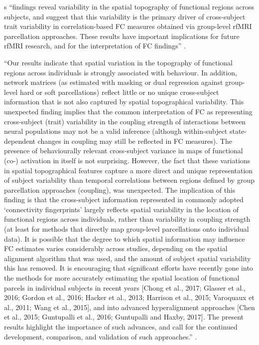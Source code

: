 \citet{bijsterbosch2018relationship}s ``findings reveal variability in the
spatial topography of functional regions across subjects, and suggest that this
variability is the primary driver of cross-subject trait variability in
correlation-based FC measures obtained via group-level rfMRI parcellation
approaches.
%
These results have important implications for future rfMRI research, and for the
interpretation of FC findings'' \citep{bijsterbosch2018relationship}.



``Our results indicate that spatial variation in the topography of functional
regions across individuals is strongly associated with behaviour.
%
In addition, network matrices (as estimated with masking or dual regression
against group-level hard or soft parcellations) reflect little or no unique
cross-subject information that is not also captured by spatial topographical
variability.
%
This unexpected finding implies that the common interpretation of FC as
representing cross-subject (trait) variability in the coupling strength of
interactions between neural populations may not be a valid inference (although
within-subject state-dependent changes in coupling may still be reflected in FC
measures).
%
The presence of behaviourally relevant cross-subject variance in maps of
functional (co-) activation in itself is not surprising.
%
However, the fact that these variations in spatial topographical features
capture a more direct and unique representation of subject variability than
temporal correlations between regions defined by group parcellation approaches
(coupling), was unexpected.
%
The implication of this finding is that the cross-subject information
represented in commonly adopted ‘connectivity fingerprints’ largely reflects
spatial variability in the location of functional regions across individuals,
rather than variability in coupling strength (at least for methods that directly
map group-level parcellations onto individual data).
%
%
It is possible that the degree to which spatial information may influence FC
estimates varies considerably across studies, depending on the spatial alignment
algorithm that was used, and the amount of subject spatial variability this has
removed.
%
It is encouraging that significant efforts have recently gone into the methods
for more accurately estimating the spatial location of functional parcels in
individual subjects in recent years [Chong et al., 2017; Glasser et al., 2016;
Gordon et al., 2016; Hacker et al., 2013; Harrison et al., 2015; Varoquaux et
al., 2011; Wang et al., 2015], and into advanced hyperalignment approaches [Chen
et al., 2015; Guntupalli et al., 2016; Guntupalli and Haxby, 2017].
%
The present results highlight the importance of such advances, and call for the
continued development, comparison, and validation of such approaches.''
\citep{bijsterbosch2018relationship}.


